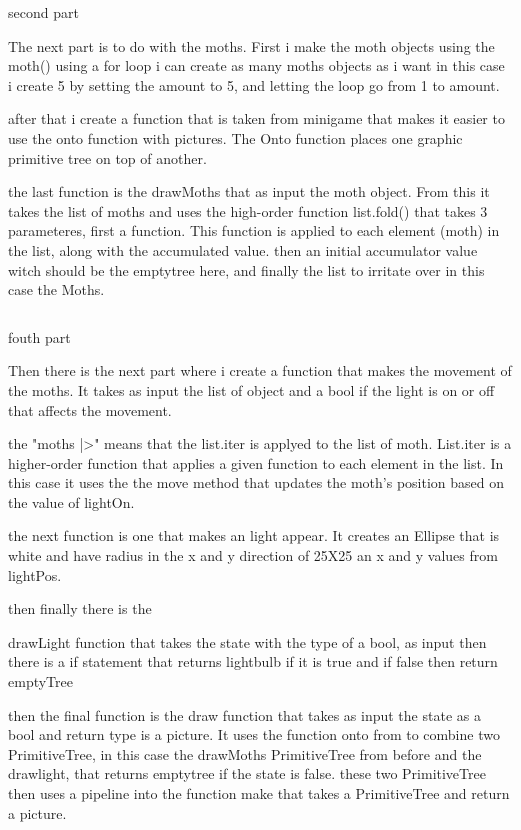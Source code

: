 \documentclass{article}
\begin{document}
\label{app:appA}
\begin{listing}[!ht]
\inputminted{fsharp}{Code/thirdpart.tex}
\caption{second part}
\label{app:vec_example}
\end{listing}


The next part is to do with the moths. First i make the moth objects using the moth() using a for loop i can create as many moths objects as i want in this case i create 5 by setting the amount to 5, and letting the loop go from 1 to amount. 

after that i create a function that is taken from minigame that makes it easier to use the onto function with pictures. The Onto function places one graphic primitive tree on top of another. 

the last function is the drawMoths that as input the moth object. From this it takes the list of moths and uses the high-order function list.fold() that takes 3 parameteres, first a function. This function is applied to each element (moth) in the list, along with the accumulated value. then an initial accumulator value witch should be the emptytree here, and finally the list to irritate over in this case the Moths.



\label{app:appA}
\begin{listing}[!ht]
\inputminted{fsharp}{Code/fouthpart.tex}
\caption{fouth part}
\label{app:vec_example}
\end{listing}

Then there is the next part where i create a function that makes the movement of the moths. It takes as input the list of object and a bool if the light is on or off that affects the movement. 


the "moths |>" means that the list.iter is applyed to the list of moth. 
List.iter is a higher-order function that applies a given function to each element in the list.  In this case it uses the the move method that updates the moth’s position based on the value of lightOn.

the next function is one that makes an light appear. It creates an Ellipse that is white and have radius in the x and y direction of 25X25 an x and y values from lightPos.


then finally there is the 

drawLight function that takes the state with the type of a bool, as input
then there is a if statement that returns lightbulb if it is true and if false then return emptyTree


then the final function is the draw function that takes as input the state as a bool and return type is a picture. It uses the function onto from to combine two PrimitiveTree, in this case the drawMoths  PrimitiveTree from before and the drawlight, that returns emptytree if the state is false. these two PrimitiveTree then uses a pipeline into the function make that takes a PrimitiveTree and return a picture. 
\end{document}
